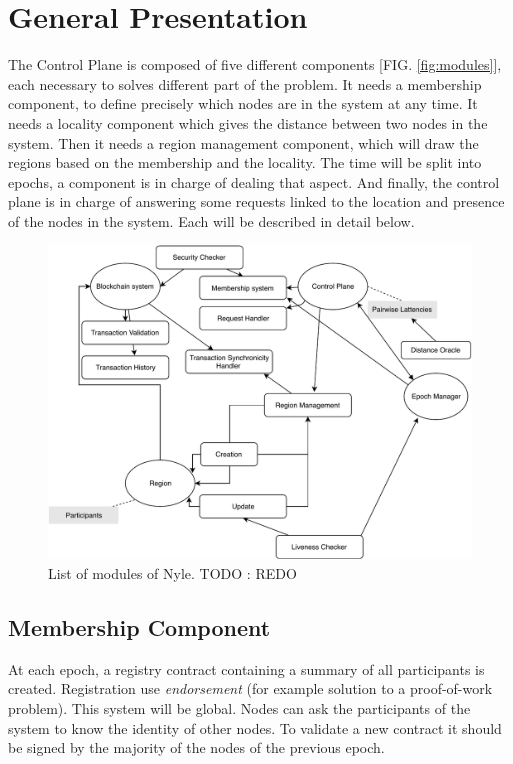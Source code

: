 \documentclass[a4paper,11pt,oneside]{report}
\begin{document}
\section{General Presentation}

The Control Plane is composed of five different components [FIG.
\autoref{fig:modules}], each necessary to solves different part of the problem. It
needs a membership component, to define precisely which nodes are in the system
at any time. It needs a locality component which gives the distance between two
nodes in the system. Then it needs a region management component, which will
draw the regions based on the membership and the locality. The time will be
split into epochs, a component is in charge of dealing that aspect. And
finally, the control plane is in charge of answering some requests linked to
the location and presence of the nodes in the system. Each will be described in
detail below. 

\begin{figure}[!h]
\centering
\includegraphics[width=400pt]{figures/Nyle_components}
\caption{List of modules of Nyle.  \color{red} TODO : REDO \color{black}}
\label{fig:modules}
\end{figure}

\subsection{Membership Component}

At each epoch, a registry contract containing a summary of all participants is
created. Registration use \textit{endorsement} (for example solution to a proof-of-work
problem). This system will be global. Nodes can ask the participants of the
system to know the identity of other nodes. To validate a new contract it
should be signed by the majority of the nodes of the previous epoch.
\end{document}
